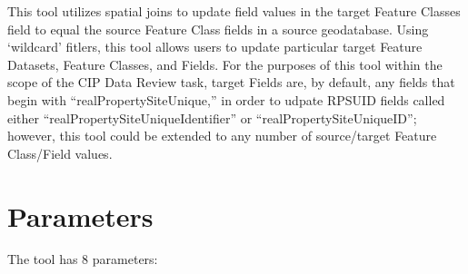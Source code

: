 \documentclass[openany]{book}
\theoremstyle{definition}
\theoremstyle{definition}
\theoremstyle{definition}
\theoremstyle{remark}
\begin{document}
This tool utilizes spatial joins to update field values in the target
Feature Classes field to equal the source Feature Class fields in a
source geodatabase. Using `wildcard' fitlers, this tool allows users to
update particular target Feature Datasets, Feature Classes, and Fields.
For the purposes of this tool within the scope of the CIP Data Review
task, target Fields are, by default, any fields that begin with
``realPropertySiteUnique,'' in order to udpate RPSUID fields called
either ``realPropertySiteUniqueIdentifier'' or
``realPropertySiteUniqueID''; however, this tool could be extended to
any number of source/target Feature Class/Field values.

\section{Parameters}\label{parameters-2}

The tool has 8 parameters:
\end{document}
